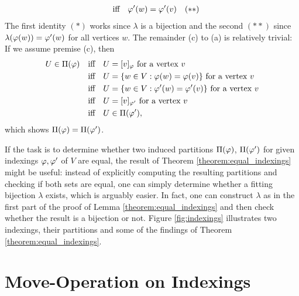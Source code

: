 \begin{appendixproof}
\begin{align*}
        &\quad\text{iff}\quad \varphi'(w) = \varphi'(v) &(**)
    \end{align*}
    The first identity $(*)$ works since $\lambda$ is a bijection and the second $(**)$ since $\lambda(\varphi(w))=\varphi'(w)$ for all vertices $w$.
    The remainder (c) to (a) is relatively trivial: If we assume premise (c), then
    \begin{align*}
        U \in \Pi(\varphi) &\quad\text{iff}\quad U = [v]_\varphi \text{ for a vertex $v$} \\
        &\quad\text{iff}\quad U = \{ w \in V : \varphi(w) = \varphi(v) \} \text{ for a vertex $v$} \\
        &\quad\text{iff}\quad U = \{ w \in V : \varphi'(w) = \varphi'(v) \} \text{ for a vertex $v$} \\ 
        &\quad\text{iff}\quad U = [v]_{\varphi'} \text{ for a vertex $v$} \\
        &\quad\text{iff}\quad U \in \Pi(\varphi'),
    \end{align*}
    which shows $\Pi(\varphi)=\Pi(\varphi')$.
\end{appendixproof}

If the task is to determine whether two induced partitions $\Pi(\varphi)$, $\Pi(\varphi')$ for given indexings $\varphi,\varphi'$ of $V$ are equal, the result of Theorem \ref{theorem:equal_indexings} might be useful: instead of explicitly computing the resulting partitions and checking if both sets are equal, one can simply determine whether a fitting bijection $\lambda$ exists, which is arguably easier. In fact, one can construct $\lambda$ as in the first part of the proof of Lemma \ref{theorem:equal_indexings} and then check whether the result is a bijection or not. Figure \ref{fig:indexings} illustrates two indexings, their partitions and some of the findings of Theorem \ref{theorem:equal_indexings}.


\section{Move-Operation on Indexings}

